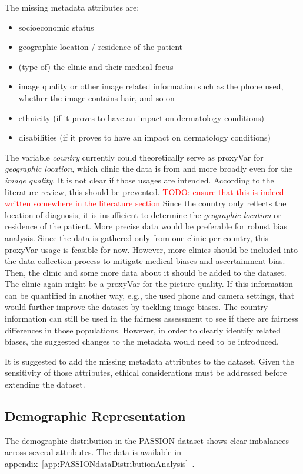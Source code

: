 \documentclass[12pt, a4paper, oneside]{book}   	%
\renewcommand{\todo}[1]{\textcolor{red}{TODO: #1}}
\newcommand{\linkapp}[1]{\hyperref[#1]{appendix~\ref{#1}~\nameref{#1}}}
\begin{document}
		The missing metadata attributes are:
		\begin{itemize}
			\item socioeconomic status
			\item geographic location / residence of the patient
			\item (type of) the clinic and their medical focus
			\item image quality or other image related information such as the phone used, whether the image contains hair, and so on
			\item ethnicity (if it proves to have an impact on dermatology conditions)
			\item disabilities (if it proves to have an impact on dermatology conditions)
		\end{itemize}
		
		The variable \textit{country} currently could theoretically serve as \gls{proxyVar} for \textit{geographic location}, which clinic the data is from and more broadly even for the \textit{image quality}. It is not clear if those usages are intended. According to the literature review, this should be prevented. \todo{ensure that this is indeed written somewhere in the literature section}
		Since the country only reflects the location of diagnosis, it is insufficient to determine the \textit{geographic location} or residence of the patient. More precise data would be preferable for robust bias analysis.
		Since the data is gathered only from one clinic per country, this \gls{proxyVar} usage is feasible for now. However, more clinics should be included into the data collection process to mitigate medical biases and ascertainment bias. Then, the clinic and some more data about it should be added to the dataset.
		The clinic again might be a \gls{proxyVar} for the picture quality. If this information can be quantified in another way, e.g., the used phone and camera settings, that would further improve the dataset by tackling image biases.
		The country information can still be used in the fairness assessment to see if there are fairness differences in those populations. However, in order to clearly identify related biases, the suggested changes to the metadata would need to be introduced.
		
		It is suggested to add the missing metadata attributes to the dataset. Given the sensitivity of those attributes, ethical considerations must be addressed before extending the dataset.
		
		\subsection{Demographic Representation}	\label{chap:PASSIONDatasetAssessmentEvalDemogRepr}
		The demographic distribution in the PASSION dataset shows clear imbalances across several attributes. The data is available in \linkapp{app:PASSIONdataDistributionAnalysis}.
		
\end{document}
